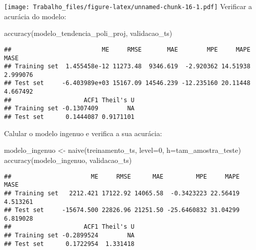 \documentclass[
]{article}
\newenvironment{Shaded}{\begin{snugshade}}{\end{snugshade}}
\newcommand{\AttributeTok}[1]{\textcolor[rgb]{0.77,0.63,0.00}{#1}}
\newcommand{\DecValTok}[1]{\textcolor[rgb]{0.00,0.00,0.81}{#1}}
\newcommand{\FunctionTok}[1]{\textcolor[rgb]{0.00,0.00,0.00}{#1}}
\newcommand{\NormalTok}[1]{#1}
\newcommand{\OtherTok}[1]{\textcolor[rgb]{0.56,0.35,0.01}{#1}}
\begin{document}
\texttt{[image: Trabalho\_files/figure-latex/unnamed-chunk-16-1.pdf]}
Verificar a acurácia do modelo:

\begin{Shaded}
\begin{Highlighting}[]
\FunctionTok{accuracy}\NormalTok{(modelo\_tendencia\_poli\_proj, validacao\_ts)}
\end{Highlighting}
\end{Shaded}

\begin{verbatim}
##                         ME     RMSE       MAE        MPE     MAPE     MASE
## Training set  1.455458e-12 11273.48  9346.619  -2.920362 14.51938 2.999076
## Test set     -6.403989e+03 15167.09 14546.239 -12.235160 20.11448 4.667492
##                    ACF1 Theil's U
## Training set -0.1307409        NA
## Test set      0.1444087 0.9171101
\end{verbatim}

Calular o modelo ingenuo e verifica a sua acurácia:

\begin{Shaded}
\begin{Highlighting}[]
\NormalTok{modelo\_ingenuo }\OtherTok{\textless{}{-}} \FunctionTok{naive}\NormalTok{(treinamento\_ts, }\AttributeTok{level=}\DecValTok{0}\NormalTok{, }\AttributeTok{h=}\NormalTok{tam\_amostra\_teste)}
\FunctionTok{accuracy}\NormalTok{(modelo\_ingenuo, validacao\_ts)}
\end{Highlighting}
\end{Shaded}

\begin{verbatim}
##                      ME     RMSE      MAE         MPE     MAPE     MASE
## Training set   2212.421 17122.92 14065.58  -0.3423223 22.56419 4.513261
## Test set     -15674.500 22826.96 21251.50 -25.6460832 31.04299 6.819028
##                    ACF1 Theil's U
## Training set -0.2899524        NA
## Test set      0.1722954  1.331418
\end{verbatim}
\end{document}
